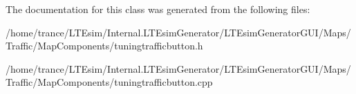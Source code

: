 The documentation for this class was generated from the following files\+:\begin{DoxyCompactItemize}
\item 
/home/trance/\+L\+T\+Esim/\+Internal.\+L\+T\+Esim\+Generator/\+L\+T\+Esim\+Generator\+G\+U\+I/\+Maps/\+Traffic/\+Map\+Components/tuningtrafficbutton.\+h\item 
/home/trance/\+L\+T\+Esim/\+Internal.\+L\+T\+Esim\+Generator/\+L\+T\+Esim\+Generator\+G\+U\+I/\+Maps/\+Traffic/\+Map\+Components/tuningtrafficbutton.\+cpp\end{DoxyCompactItemize}
